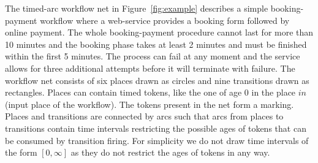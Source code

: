 The timed-arc workflow net in Figure~\ref{fig:example} 
describes a simple booking-payment workflow
where a web-service provides a booking form followed by online payment.
The whole booking-payment procedure cannot last for more than 10 mi\-nutes
and the booking phase takes at least 2 minutes and 
must be finished within the first 5 minutes. The process can
fail at any moment and the service allows for three additional attempts
before it will terminate with failure. The workflow net 
consists of six places drawn as circles and nine transitions
drawn as rectangles. Places can contain timed tokens, like the one
of age $0$ in the place $\mathit{in}$ (input place of the workflow).
The tokens present in the net form a marking. 
Places and transitions are connected by arcs
such that arcs from places to transitions contain time intervals restricting
the possible ages of tokens that can be consumed by transition firing.
For simplicity we do not draw time intervals of the form $[0,\infty]$
as they do not restrict the ages of tokens in any way.

